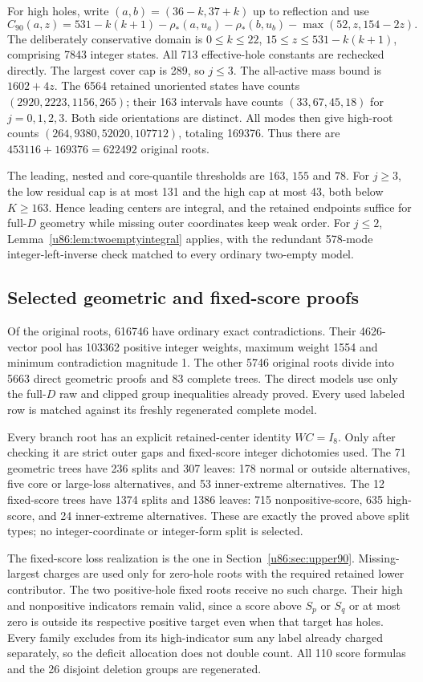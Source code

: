 \documentclass[11pt,a4paper]{article}
\theoremstyle{remark}
\begin{document}
For high holes, write $(a,b)=(36-k,37+k)$ up to reflection and use
\[
 C_{90}(a,z)=531-k(k+1)-\rho_*(a,u_a)-\rho_*(b,u_b)
                              -\max(52,z,154-2z).
\]
The deliberately conservative domain is $0\le k\le22$,
$15\le z\le531-k(k+1)$, comprising 7843 integer states. All 713
effective-hole constants are rechecked directly. The largest cover cap
is 289, so $j\le3$. The all-active mass bound is $1602+4z$.
The 6564 retained unoriented states have counts $(2920,2223,1156,265)$;
their 163 intervals have counts $(33,67,45,18)$ for $j=0,1,2,3$.
Both side orientations are distinct. All modes then give high-root counts
$(264,9380,52020,107712)$, totaling 169376. Thus there are
$453116+169376=622492$ original roots.

The leading, nested and core-quantile thresholds are $163$, $155$ and
$78$. For $j\ge3$, the low residual cap is at most 131 and the high cap
at most 43, both below $K\ge163$. Hence leading centers are integral,
and the retained endpoints suffice for full-$D$ geometry while missing
outer coordinates keep weak order. For $j\le2$,
Lemma~\ref{u86:lem:twoemptyintegral} applies, with the redundant 578-mode
integer-left-inverse check matched to every ordinary two-empty model.

\subsection{Selected geometric and fixed-score proofs}
Of the original roots, 616746 have ordinary exact contradictions. Their
4626-vector pool has 103362 positive integer weights, maximum weight
1554 and minimum contradiction magnitude 1. The other 5746 original
roots divide into 5663 direct geometric proofs and 83 complete trees.
The direct models use only the full-$D$ raw and clipped group inequalities
already proved. Every used labeled row is matched against its freshly
regenerated complete model.

Every branch root has an explicit retained-center identity $WC=I_8$.
Only after checking it are strict outer gaps and fixed-score integer
dichotomies used. The 71 geometric trees have 236 splits and 307 leaves:
178 normal or outside alternatives, five core or large-loss alternatives,
and 53 inner-extreme alternatives. The 12 fixed-score trees have 1374
splits and 1386 leaves: 715 nonpositive-score, 635 high-score, and 24
inner-extreme alternatives. These are exactly the proved above
split types; no integer-coordinate or integer-form split is selected.

The fixed-score loss realization is the one in
Section~\ref{u86:sec:upper90}. Missing-largest charges are used only for
zero-hole roots with the required retained lower contributor. The two
positive-hole fixed roots receive no such charge. Their high and
nonpositive indicators remain valid, since a score above $S_p$ or $S_q$
or at most zero is outside its respective positive target even when that
target has holes. Every family excludes from its high-indicator sum any
label already charged separately, so the deficit allocation does not
double count. All 110 score formulas and the 26 disjoint deletion groups
are regenerated.
\end{document}
